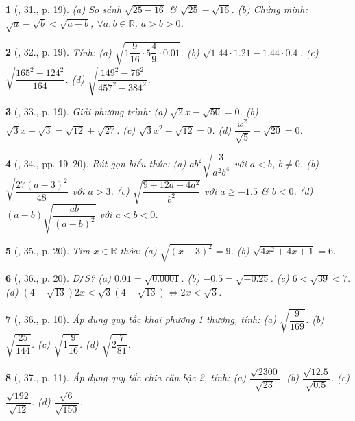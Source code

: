 \documentclass{article}
\newtheorem{baitoan}{}%
\begin{document}
\begin{baitoan}[\cite{SGK_Toan_9_tap_1}, 31., p. 19]
	(a) So sánh $\sqrt{25 - 16}$ \& $\sqrt{25} - \sqrt{16}$. (b) Chứng minh: $\sqrt{a} - \sqrt{b} < \sqrt{a - b}$, $\forall a,b\in\mathbb{R}$, $a > b > 0$.
\end{baitoan}

\begin{baitoan}[\cite{SGK_Toan_9_tap_1}, 32., p. 19]
	Tính: (a) $\sqrt{1\dfrac{9}{16}\cdot5\dfrac{4}{9}\cdot0.01}$. (b) $\sqrt{1.44\cdot1.21 - 1.44\cdot0.4}$. (c) $\sqrt{\dfrac{165^2 - 124^2}{164}}$. (d) $\sqrt{\dfrac{149^2 - 76^2}{457^2 - 384^2}}$.
\end{baitoan}

\begin{baitoan}[\cite{SGK_Toan_9_tap_1}, 33., p. 19]
	Giải phương trình: (a)  $\sqrt{2}x - \sqrt{50} = 0$. (b) $\sqrt{3}x + \sqrt{3} = \sqrt{12} + \sqrt{27}$. (c) $\sqrt{3}x^2 - \sqrt{12} = 0$. (d) $\dfrac{x^2}{\sqrt{5}} - \sqrt{20} = 0$.
\end{baitoan}

\begin{baitoan}[\cite{SGK_Toan_9_tap_1}, 34., pp. 19--20]
	Rút gọn biểu thức: (a) $ab^2\sqrt{\dfrac{3}{a^2b^4}}$ với $a < b$, $b\ne0$. (b) $\sqrt{\dfrac{27(a - 3)^2}{48}}$ với $a > 3$. (c) $\sqrt{\dfrac{9 + 12a + 4a^2}{b^2}}$ với $a\ge-1.5$ \& $b < 0$. (d) $(a - b)\sqrt{\dfrac{ab}{(a - b)^2}}$ với $a < b < 0$.
\end{baitoan}

\begin{baitoan}[\cite{SGK_Toan_9_tap_1}, 35., p. 20]
	Tìm $x\in\mathbb{R}$ thỏa: (a) $\sqrt{(x - 3)^2} = 9$. (b) $\sqrt{4x^2 + 4x + 1} = 6$.
\end{baitoan}

\begin{baitoan}[\cite{SGK_Toan_9_tap_1}, 36., p. 20]
	\emph{Đ\texttt{/}S?} (a) $0.01 = \sqrt{0.0001}$. (b) $-0.5 = \sqrt{-0.25}$. (c) $6 < \sqrt{39} < 7$. (d) $(4 - \sqrt{13})2x < \sqrt{3}(4 - \sqrt{13})\Leftrightarrow2x < \sqrt{3}$.
\end{baitoan}

\begin{baitoan}[\cite{SBT_Toan_9_tap_1}, 36., p. 10]
	Áp dụng quy tắc khai phương 1 thương, tính: (a) $\sqrt{\dfrac{9}{169}}$. (b) $\sqrt{\dfrac{25}{144}}$. (c) $\sqrt{1\dfrac{9}{16}}$. (d) $\sqrt{2\dfrac{7}{81}}$.
\end{baitoan}

\begin{baitoan}[\cite{SBT_Toan_9_tap_1}, 37., p. 11]
	Áp dụng quy tắc chia căn bậc 2, tính: (a) $\dfrac{\sqrt{2300}}{\sqrt{23}}$. (b) $\dfrac{\sqrt{12.5}}{\sqrt{0.5}}$. (c) $\dfrac{\sqrt{192}}{\sqrt{12}}$. (d) $\dfrac{\sqrt{6}}{\sqrt{150}}$.
\end{baitoan}
\end{document}
